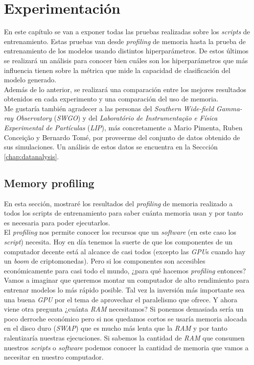 \chapter{Experimentación}

En este capítulo se van a exponer todas las pruebas realizadas sobre los \textit{scripts} de entrenamiento. Estas pruebas van desde \textit{profiling} de memoria hasta la prueba de entrenamiento de los modelos usando distintos hiperparámetros. De estos últimos se realizará un análisis para conocer bien cuáles son los hiperparámetros que más influencia tienen sobre la métrica que mide la capacidad de clasificación del modelo generado.\\

Además de lo anterior, se realizará una comparación entre los mejores resultados obtenidos en cada experimento y una comparación del uso de memoria.\\

Me gustaría también agradecer a las personas del \textit{Southern Wide-field Gamma-ray Observatory} (\textit{SWGO}) y del \textit{Laboratório de Instrumentação e Física Experimental de Partículas} (\textit{LIP}), más concretamente a Mario Pimenta, Ruben Conceição y Bernardo Tomé, por proveerme del conjunto de datos obtenido de sus simulaciones. Un análisis de estos datos se encuentra en la Seccción \ref{chap:datanalysis}.

\section{Memory profiling}

En esta sección, mostraré los resultados del \textit{profiling} de memoria realizado a todos los scripts de entrenamiento para saber cuánta memoria usan y por tanto es necesaria para poder ejecutarlos.\\

El \textit{profiling} nos permite conocer los recursos que un \textit{software} (en este caso los \textit{script}) necesita. Hoy en día tenemos la suerte de que los componentes de un computador decente está al alcance de casi todos (excepto las \textit{GPU}s cuando hay un \textit{boom} de criptomonedas). Pero si los componentes son accesibles económicamente para casi todo el mundo, ¿para qué hacemos \textit{profiling} entonces? Vamos a imaginar que queremos montar un computador de alto rendimiento para entrenar modelos lo más rápido posible. Tal vez la inversión más importante sea una buena \textit{GPU} por el tema de aprovechar el paralelismo que ofrece. Y ahora viene otra pregunta ¿cuánta \textit{RAM} necesitamos? Si ponemos demasiada sería un poco derroche económico pero si nos quedamos cortos se usaría memoria alocada en el disco duro (\textit{SWAP}) que es mucho más lenta que la \textit{RAM} y por tanto ralentizaría nuestras ejecuciones. Si sabemos la cantidad de \textit{RAM} que consumen nuestros \textit{scripts} o \textit{software} podemos conocer la cantidad de memoria que vamos a necesitar en nuestro computador.\\

